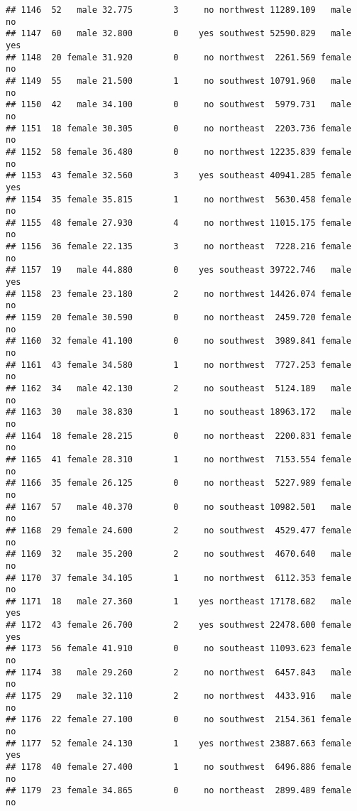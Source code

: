 \documentclass[
]{article}
\begin{document}
\begin{verbatim}
## 1146  52   male 32.775        3     no northwest 11289.109   male       no
## 1147  60   male 32.800        0    yes southwest 52590.829   male      yes
## 1148  20 female 31.920        0     no northwest  2261.569 female       no
## 1149  55   male 21.500        1     no southwest 10791.960   male       no
## 1150  42   male 34.100        0     no southwest  5979.731   male       no
## 1151  18 female 30.305        0     no northeast  2203.736 female       no
## 1152  58 female 36.480        0     no northwest 12235.839 female       no
## 1153  43 female 32.560        3    yes southeast 40941.285 female      yes
## 1154  35 female 35.815        1     no northwest  5630.458 female       no
## 1155  48 female 27.930        4     no northwest 11015.175 female       no
## 1156  36 female 22.135        3     no northeast  7228.216 female       no
## 1157  19   male 44.880        0    yes southeast 39722.746   male      yes
## 1158  23 female 23.180        2     no northwest 14426.074 female       no
## 1159  20 female 30.590        0     no northeast  2459.720 female       no
## 1160  32 female 41.100        0     no southwest  3989.841 female       no
## 1161  43 female 34.580        1     no northwest  7727.253 female       no
## 1162  34   male 42.130        2     no southeast  5124.189   male       no
## 1163  30   male 38.830        1     no southeast 18963.172   male       no
## 1164  18 female 28.215        0     no northeast  2200.831 female       no
## 1165  41 female 28.310        1     no northwest  7153.554 female       no
## 1166  35 female 26.125        0     no northeast  5227.989 female       no
## 1167  57   male 40.370        0     no southeast 10982.501   male       no
## 1168  29 female 24.600        2     no southwest  4529.477 female       no
## 1169  32   male 35.200        2     no southwest  4670.640   male       no
## 1170  37 female 34.105        1     no northwest  6112.353 female       no
## 1171  18   male 27.360        1    yes northeast 17178.682   male      yes
## 1172  43 female 26.700        2    yes southwest 22478.600 female      yes
## 1173  56 female 41.910        0     no southeast 11093.623 female       no
## 1174  38   male 29.260        2     no northwest  6457.843   male       no
## 1175  29   male 32.110        2     no northwest  4433.916   male       no
## 1176  22 female 27.100        0     no southwest  2154.361 female       no
## 1177  52 female 24.130        1    yes northwest 23887.663 female      yes
## 1178  40 female 27.400        1     no southwest  6496.886 female       no
## 1179  23 female 34.865        0     no northeast  2899.489 female       no

\end{verbatim}
\end{document}
